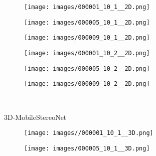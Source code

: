 \begin{figure*}[htpb]
\begin{center}
\begin{minipage}[c]{0.985\textwidth}
			\begin{subfigure}[c]{0.33\linewidth}
				\texttt{[image: images/000001\_10\_1\_\_2D.png]}
			\end{subfigure}
			\hspace{-0.5\baselineskip}
			\hfill
			\begin{subfigure}[c]{0.33\linewidth}
				\texttt{[image: images/000005\_10\_1\_\_2D.png]}
			\end{subfigure}
			\hspace{-0.5\baselineskip}
			\hfill
			\begin{subfigure}[c]{0.33\linewidth}
				\texttt{[image: images/000009\_10\_1\_\_2D.png]}
			\end{subfigure}
			\begin{subfigure}[c]{0.33\linewidth}
				\texttt{[image: images/000001\_10\_2\_\_2D.png]}
			\end{subfigure}
			\hspace{-0.5\baselineskip}
			\hfill
			\begin{subfigure}[c]{0.33\linewidth}
				\texttt{[image: images/000005\_10\_2\_\_2D.png]}
			\end{subfigure}
			\hspace{-0.5\baselineskip}
			\hfill
			\begin{subfigure}[c]{0.33\linewidth}
				\texttt{[image: images/000009\_10\_2\_\_2D.png]}
			\end{subfigure}
		\end{minipage}
		\\
\begin{minipage}[c]{0.01\textwidth}
			\begin{turn}{90}\footnotesize{3D-MobileStereoNet}\end{turn}			
		\end{minipage}
		\begin{minipage}[c]{0.985\textwidth}
			\begin{subfigure}[c]{0.33\linewidth}
				\texttt{[image: images//000001\_10\_1\_\_3D.png]}
			\end{subfigure}
			\hspace{-0.5\baselineskip}
			\hfill
			\begin{subfigure}[c]{0.33\linewidth}
				\texttt{[image: images/000005\_10\_1\_\_3D.png]}
			\end{subfigure}
			\hspace{-0.5\baselineskip}

\end{minipage}
\end{center}
\end{figure*}

